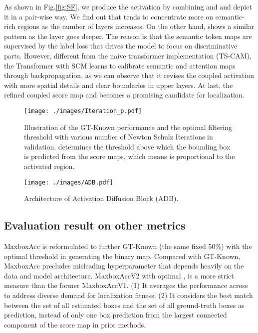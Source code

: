 \documentclass[runningheads]{llncs}
\begin{document}
As shown in Fig.\ref{fig:SF}, we produce the activation by combining  and  and depict it in a pair-wise way. We find out that  tends to concentrate more on semantic-rich regions as the number of layers increases. On the other hand,  shows a similar pattern as the layer goes deeper. The reason is that the semantic token maps  are supervised by the label loss that drives the model to focus on discriminative parts. However, different from the naive transformer implementation (TS-CAM), the Transformer with SCM learns to calibrate semantic and attention maps through backpropagation, as we can observe that it revises the coupled activation with more spatial details and clear boundaries in upper layers. At last, the refined coupled score map  and  becomes a promising candidate for localization.

\begin{figure*}[th]
\centering
\texttt{[image: ./images/Iteration\_p.pdf]}
\caption{Illustration of the GT-Known performance and the optimal filtering threshold  with various number of Newton Schulz Iterations  in validation.  determines the threshold above which the bounding box is predicted from the score maps, which means  is proportional to the activated region.} 
\label{fig:iteration_performance}
\end{figure*}

\begin{figure*}[th]
\centering
\texttt{[image: ./images/ADB.pdf]}
\caption{Architecture of  Activation Diffusion Block (ADB). }
\label{appendix:ADB_arch}
\end{figure*}

\subsection{Evaluation result on other metrics}
MaxboxAcc is reformulated to further GT-Known (the same fixed  50\%) with the optimal threshold  in generating the binary map.
 Compared with GT-Known, MaxboxAcc precludes misleading hyperparameter  that depends heavily on the data and model architecture. MaxboxAccV2 with optimal , is a more strict measure than the former MaxboxAccV1. 
 (1) It averages the performance across  to address diverse demand for localization fitness. (2) It considers the best match between the set of all estimated boxes and the set of all ground-truth boxes as prediction, instead of only one box prediction from the largest connected component of the score map in prior methods. 
 
\end{document}
